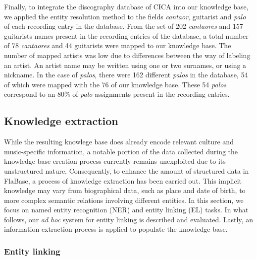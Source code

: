 Finally, to integrate the discography database of CICA into our knowledge base, we applied the entity resolution method to the fields \textit{cantaor}, guitarist and \textit{palo} of each recording entry in the database. From the set of 202 \textit{cantaores} and 157 guitarists names present in the recording entries of the database, a total number of 78 \textit{cantaores} and 44 guitarists were mapped to our knowledge base. The number of mapped artists was low due to differences between the way of labeling an artist. An artist name may be written using one or two surnames, or using a nickname. In the case of \textit{palos}, there were 162 different \textit{palos} in the database, 54 of which were mapped with the 76 of our knowledge base. These 54 \textit{palos} correspond to an 80\% of \textit{palo} assignments present in the recording entries.


\subsection{Knowledge extraction}
\label{sec:musicology:kb_extraction}

While the resulting knowlege base does already encode relevant culture and music-specific information, a notable portion of the data collected during the knowledge base creation process currently remains unexploited due to its unstructured nature. %
Consequently, to enhance the amount of structured data in FlaBase, a process of knowledge extraction has been carried out. This implicit knowledge may vary from biographical data, such as place and date of birth, to more complex semantic relations involving different entities. %
In this section, we focus on named entity recognition (NER) and entity linking (EL) tasks. In what follows, our \textit{ad hoc} system for entity linking is described and evaluated. Lastly, an information extraction process is applied to populate the knowledge base.

\subsubsection{Entity linking}\label{sec:musicology:entity_linking}

